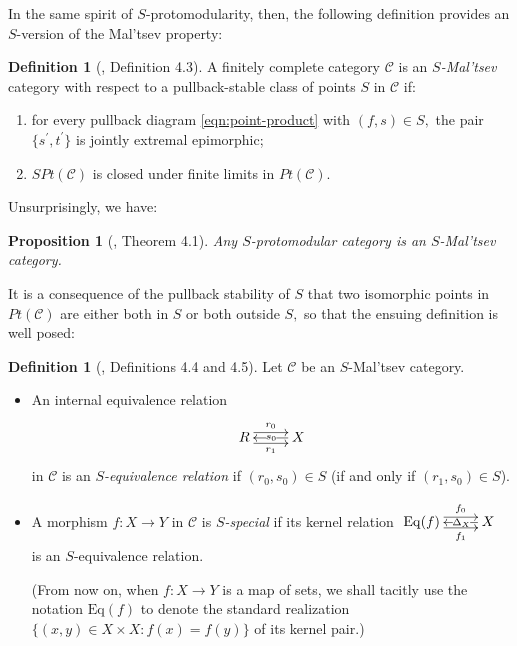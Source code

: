 \documentclass[11pt]{amsart}
\theoremstyle{plain}
\newtheorem{proposition}[subsubsection]{Proposition}
\theoremstyle{definition}
\newtheorem{definition}[subsubsection]{Definition}
\theoremstyle{remark}
\begin{document}
In the same spirit of $S$-protomodularity, then, the following definition provides an $S$-version of the Mal'tsev property:
\begin{definition}[\cite{mal'tsev-reflection}, Definition 4.3]
A finitely complete category $\mathcal{C}$ is an $S$\emph{-Mal'tsev} category with respect to a pullback-stable class of points $S$ in $\mathcal{C}$ if:
\begin{enumerate}
\item for every pullback diagram \eqref{eqn:point-product} with $(f,s)\in S,$ the pair $\{s^\prime,t^\prime\}$ is jointly extremal epimorphic;
\item $SPt(\mathcal{C})$ is closed under finite limits in $Pt(\mathcal{C}).$
\end{enumerate}
\end{definition}
Unsurprisingly, we have:
\begin{proposition}[\cite{mal'tsev-reflection}, Theorem 4.1]
Any $S$-protomodular category is an $S$-Mal'tsev category.
\end{proposition}
It is a consequence of the pullback stability of $S$ that two isomorphic points in $Pt(\mathcal{C})$ are either both in $S$ or both outside $S,$ so that the ensuing definition is well posed:
\begin{definition}[\cite{mal'tsev-reflection}, Definitions 4.4 and 4.5]
\label{def:S-special}
Let $\mathcal{C}$ be an $S$-Mal'tsev category.
\begin{itemize}
\item An internal equivalence relation
\begin{equation*}
\xymatrix{
{R} \ar@<.9ex>[r]^-{r_0} \ar@<-.9ex>[r]_-{r_1} &X \ar[l]|{s_0}
}
\end{equation*}
in $\mathcal{C}$ is an $S$\emph{-equivalence relation} if $(r_0,s_0)\in S$ (if and only if $(r_1,s_0)\in S$).

\item A morphism $f\colon X\rightarrow Y$ in $\mathcal{C}$ is $S$\emph{-special} if its kernel relation $\xymatrix{
{\mathrm{Eq}(f)} \ar@<.9ex>[r]^-{f_0} \ar@<-.9ex>[r]_-{f_1} &X \ar[l]|(.40){\Delta_X}
}$ is an $S$-equivalence relation.

(From now on, when $f\colon X\rightarrow Y$ is a map of sets, we shall tacitly use the notation $\mathrm{Eq}(f)$ to denote the standard realization $\{(x,y)\in X\times X:f(x)=f(y)\}$ of its kernel pair.)
\end{itemize}
\end{definition}
\end{document}
